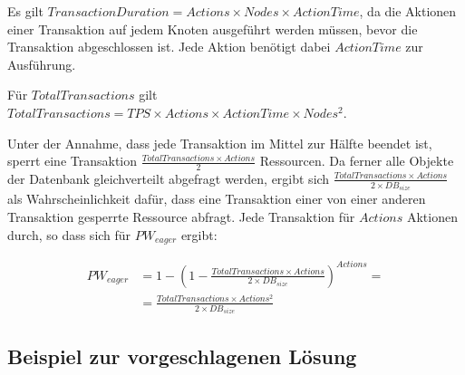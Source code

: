 \documentclass[11pt,a4paper]{scrartcl}
\begin{document}
Es gilt $TransactionDuration = Actions \times Nodes \times ActionTime$, da die
Aktionen einer Transaktion auf jedem Knoten ausgeführt werden müssen, bevor die
Transaktion abgeschlossen ist.  Jede Aktion benötigt dabei $ActionTime$ zur
Ausführung.

Für $TotalTransactions$ gilt $TotalTransactions = TPS \times Actions \times
ActionTime \times Nodes^2$.

Unter der Annahme, dass jede Transaktion im Mittel zur Hälfte beendet ist,
sperrt eine Transaktion $\frac{TotalTransactions \times Actions}{2}$
Ressourcen.  Da ferner alle Objekte der Datenbank gleichverteilt abgefragt
werden, ergibt sich $\frac{TotalTransactions\times Actions}{2 \times
  DB_{size}}$ als Wahrscheinlichkeit dafür, dass eine Transaktion einer von
einer anderen Transaktion gesperrte Ressource abfragt.  Jede Transaktion für
$Actions$ Aktionen durch, so dass sich für $PW_{eager}$ ergibt:

\begin{align*}
  PW_{eager} &= 1-\left(1 - \frac{TotalTransactions\times Actions}{2
      \times DB_{size}}\right)^{Actions} = \\
  &= \frac{TotalTransactions \times Actions^2}{2 \times DB_{size}}
\end{align*}

\subsection{Beispiel zur vorgeschlagenen Lösung}
\end{document}
